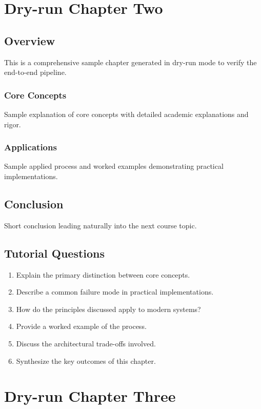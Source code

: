 \documentclass[12pt]{report}
\begin{document}
\setcounter{chapter}{1}
\chapter{Dry-run Chapter Two}

\section{Overview}
This is a comprehensive sample chapter generated in dry-run mode to verify the end-to-end pipeline.

\subsection{Core Concepts}
Sample explanation of core concepts with detailed academic explanations and rigor.

\subsection{Applications}
Sample applied process and worked examples demonstrating practical implementations.

\section{Conclusion}
Short conclusion leading naturally into the next course topic.

\section*{Tutorial Questions}
\begin{enumerate}
\item Explain the primary distinction between core concepts.
\item Describe a common failure mode in practical implementations.
\item How do the principles discussed apply to modern systems?
\item Provide a worked example of the process.
\item Discuss the architectural trade-offs involved.
\item Synthesize the key outcomes of this chapter.
\end{enumerate}

\setcounter{chapter}{2}
\chapter{Dry-run Chapter Three}
\end{document}
